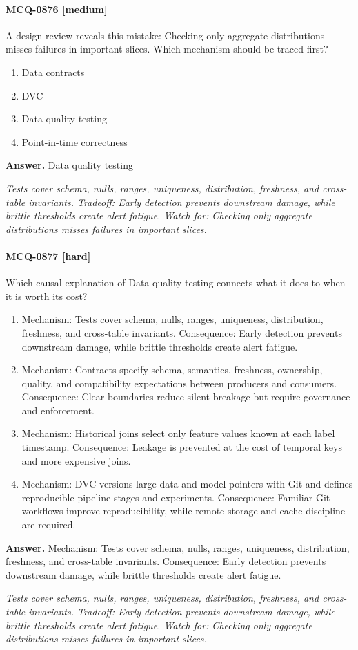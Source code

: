 \paragraph{MCQ-0876 [medium]} A design review reveals this mistake: Checking only aggregate distributions misses failures in important slices. Which mechanism should be traced first?
\begin{enumerate}[label=\Alph*.]
\item Data contracts
\item DVC
\item Data quality testing
\item Point-in-time correctness
\end{enumerate}
\noindent\textbf{Answer.} Data quality testing
\par\textit{Tests cover schema, nulls, ranges, uniqueness, distribution, freshness, and cross-table invariants. Tradeoff: Early detection prevents downstream damage, while brittle thresholds create alert fatigue. Watch for: Checking only aggregate distributions misses failures in important slices.}
\paragraph{MCQ-0877 [hard]} Which causal explanation of Data quality testing connects what it does to when it is worth its cost?
\begin{enumerate}[label=\Alph*.]
\item Mechanism: Tests cover schema, nulls, ranges, uniqueness, distribution, freshness, and cross-table invariants. Consequence: Early detection prevents downstream damage, while brittle thresholds create alert fatigue.
\item Mechanism: Contracts specify schema, semantics, freshness, ownership, quality, and compatibility expectations between producers and consumers. Consequence: Clear boundaries reduce silent breakage but require governance and enforcement.
\item Mechanism: Historical joins select only feature values known at each label timestamp. Consequence: Leakage is prevented at the cost of temporal keys and more expensive joins.
\item Mechanism: DVC versions large data and model pointers with Git and defines reproducible pipeline stages and experiments. Consequence: Familiar Git workflows improve reproducibility, while remote storage and cache discipline are required.
\end{enumerate}
\noindent\textbf{Answer.} Mechanism: Tests cover schema, nulls, ranges, uniqueness, distribution, freshness, and cross-table invariants. Consequence: Early detection prevents downstream damage, while brittle thresholds create alert fatigue.
\par\textit{Tests cover schema, nulls, ranges, uniqueness, distribution, freshness, and cross-table invariants. Tradeoff: Early detection prevents downstream damage, while brittle thresholds create alert fatigue. Watch for: Checking only aggregate distributions misses failures in important slices.}
